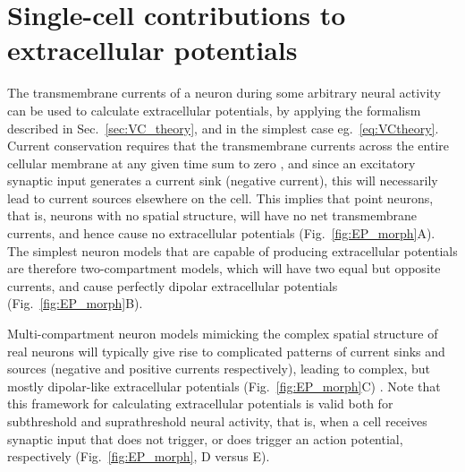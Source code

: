\documentclass[preprint,11pt,authoryear]{elsarticle}
\newcommand{\hlb}[2][blue]{ {\sethlcolor{#1} \hl{#2}} }
\newcommand{\ghnote}[1]{\color{white}{\hlb{GH: #1 }}\color{black}}
\begin{document}
\section{Single-cell contributions to extracellular potentials}



The transmembrane currents of a neuron during some arbitrary neural activity can be used to calculate extracellular potentials, by applying the formalism described in Sec.~\ref{sec:VC_theory}, and in the simplest case eg.~\ref{eq:VCtheory}.
Current conservation requires that the transmembrane currents across the entire cellular membrane at any given time sum to zero \citep{Koch1999, Nunez2006}, and since
an excitatory synaptic input generates a current sink (negative current), this will necessarily lead to current sources elsewhere on the cell. This implies that point neurons, that is, neurons with no spatial structure, will have no net transmembrane currents, and hence cause no extracellular potentials (Fig.~\ref{fig:EP_morph}A). The simplest neuron models that are capable of producing extracellular potentials are therefore two-compartment models, which will have two equal but opposite currents, and cause perfectly dipolar extracellular potentials (Fig.~\ref{fig:EP_morph}B).

Multi-compartment neuron models mimicking the complex spatial structure of real neurons will typically give rise to complicated patterns of current sinks and sources (negative and positive currents respectively), leading to complex, but mostly dipolar-like extracellular potentials (Fig.~\ref{fig:EP_morph}C) \citep{Einevoll2013}.
Note that this framework for calculating extracellular potentials is valid both for subthreshold and suprathreshold neural activity, that is, when a cell receives synaptic input that does not trigger, or does trigger an action potential, respectively (Fig.~\ref{fig:EP_morph}, D versus E).
\end{document}
